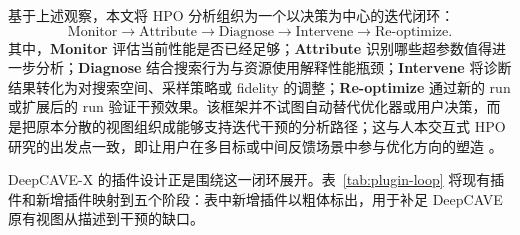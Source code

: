 \documentclass[11pt,a4paper]{ctexart}
\newcommand{\DeepCAVEX}{DeepCAVE-X}
\begin{document}
基于上述观察，本文将 HPO 分析组织为一个以决策为中心的迭代闭环：
\begin{equation}
\text{Monitor}
\rightarrow
\text{Attribute}
\rightarrow
\text{Diagnose}
\rightarrow
\text{Intervene}
\rightarrow
\text{Re-optimize}.
\label{eq:loop}
\end{equation}
其中，\textbf{Monitor} 评估当前性能是否已经足够；\textbf{Attribute} 识别哪些超参数值得进一步分析；\textbf{Diagnose} 结合搜索行为与资源使用解释性能瓶颈；\textbf{Intervene} 将诊断结果转化为对搜索空间、采样策略或 fidelity 的调整；\textbf{Re-optimize} 通过新的 run 或扩展后的 run 验证干预效果。该框架并不试图自动替代优化器或用户决策，而是把原本分散的视图组织成能够支持迭代干预的分析路径；这与人本交互式 HPO 研究的出发点一致，即让用户在多目标或中间反馈场景中参与优化方向的塑造 \cite{giovanelli2023interactive}。

\DeepCAVEX{} 的插件设计正是围绕这一闭环展开。表~\ref{tab:plugin-loop} 将现有插件和新增插件映射到五个阶段：表中新增插件以粗体标出，用于补足 DeepCAVE 原有视图从描述到干预的缺口。
\end{document}
